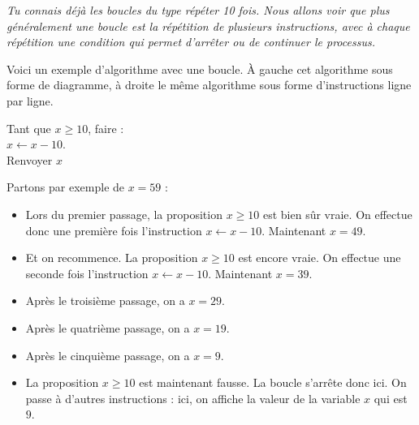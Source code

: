 \documentclass[class=report,crop=false, 12pt]{standalone}
\begin{document}

\emph{Tu connais déjà les boucles du type \emph{répéter 10 fois}.
Nous allons voir que plus généralement une \emph{boucle} est la répétition de plusieurs instructions, 
avec à chaque répétition une condition qui permet d'arrêter ou de continuer le processus.}

\bigskip
\bigskip

Voici un exemple d'algorithme avec une boucle. À gauche cet algorithme sous forme de diagramme, à droite le même algorithme sous forme d'instructions \og{}ligne par ligne\fg{}.

\begin{center}
\begin{minipage}{0.7\textwidth} 
\end{minipage}
\begin{minipage}{0.29\textwidth}
Tant que $x \ge 10$, faire :\\
\indentation $x \leftarrow x-10$.\\
Renvoyer $x$
\end{minipage}
\end{center}


Partons par exemple de $x=59$ :
\begin{itemize}
  \item Lors du premier passage, la proposition \og $x\ge10$ \fg{} est bien sûr vraie. On effectue donc une première fois l'instruction $x \leftarrow x-10$. Maintenant $x=49$. 
  \item Et on recommence. La proposition \og $x\ge10$ \fg{} est encore vraie. On effectue une seconde fois l'instruction 
 $x \leftarrow x-10$. Maintenant $x=39$.  
  \item Après le troisième passage, on a $x=29$.
  \item Après le quatrième passage, on a $x=19$.
  \item Après le cinquième passage, on a $x = 9$.
  \item La proposition \og $x \ge 10$ \fg{} est maintenant fausse. La boucle s'arrête donc ici. On passe à d'autres instructions : ici, on affiche la valeur de la variable $x$ qui est $9$.
\end{itemize}
\end{document}

